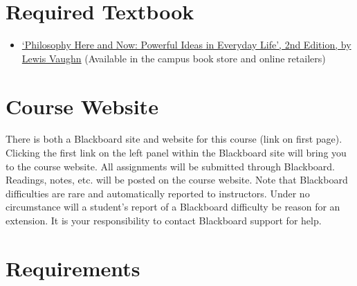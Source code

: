 \documentclass[article,oneside]{memoir}
\begin{document}
\section{Required Textbook}

\begin{itemize}
\item
  \href{http://www.amazon.com/Philosophy-Here-Now-Powerful-Everyday/dp/0190207035/ref=dp_ob_title_bk}{`Philosophy  Here and Now: Powerful Ideas in Everyday Life', 2nd Edition, by Lewis Vaughn}  (Available in the campus book store and online retailers)
\end{itemize}


\section{Course Website}
There is both a Blackboard site and website for this course (link on first page). Clicking the first link on the left panel within the Blackboard site will bring you to the course website. All assignments will be submitted through Blackboard. Readings, notes, etc. will be posted on the course website. Note that Blackboard difficulties are rare and automatically reported to instructors. Under no circumstance will a student's report of a Blackboard difficulty be reason for an extension. It is your responsibility to contact Blackboard support for help.




\section{Requirements}
\end{document}
